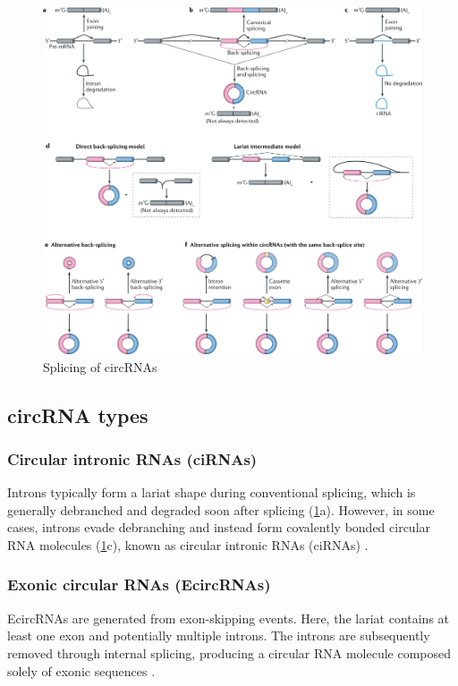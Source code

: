 \begin{figure}[h]
    \centering
    \includegraphics[width=\textwidth]{chapters/background/figures/circRNA-splicing.png}
    \caption{Splicing of circRNAs} %
    \label{fig:circRNA_splicing}
\end{figure}

\subsection{circRNA types}
\subsubsection{Circular intronic RNAs (ciRNAs)}
Introns typically form a lariat shape during conventional splicing, which is
generally debranched and degraded soon after splicing
(\cref{fig:circRNA_splicing}a). However, in some cases, introns evade
debranching and instead form covalently bonded circular RNA molecules
(\cref{fig:circRNA_splicing}c), known as circular intronic RNAs (ciRNAs)
\supercite{chen_expanding_2020,zhang_circular_2013}.

\subsubsection{Exonic circular RNAs (EcircRNAs)}
EcircRNAs are generated from exon-skipping events. Here, the lariat contains at
least one exon and potentially multiple introns. The introns are subsequently
removed through internal splicing, producing a circular RNA molecule composed
solely of exonic sequences \supercite{xiao_circular_2022, li_biogenesis_2018}.

